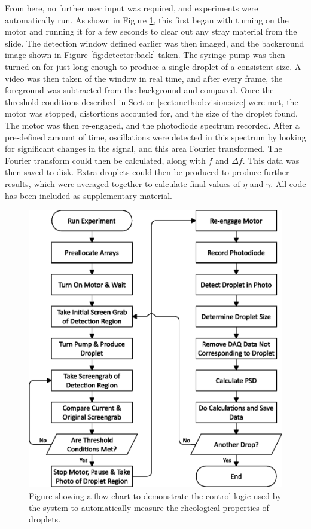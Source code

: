 \documentclass{physics_article_B}
\begin{document}
        \newpage From here, no further user input was required, and experiments were automatically run. As shown in Figure \ref{fig:setup:logic}, this first began with turning on the motor and running it for a few seconds to clear out any stray material from the slide. The detection window defined earlier was then imaged, and the background image shown in Figure \ref{fig:detector:back} taken. The syringe pump was then turned on for just long enough to produce a single droplet of a consistent size. A video was then taken of the window in real time, and after every frame, the foreground was subtracted from the background and compared. Once the threshold conditions described in Section \ref{sect:method:vision:size} were met, the motor was stopped, distortions accounted for, and the size of the droplet found. The motor was then re-engaged, and the photodiode spectrum recorded. After a pre-defined amount of time, oscillations were detected in this spectrum by looking for significant changes in the signal, and this area Fourier transformed. The Fourier transform could then be calculated, along with $f$ and $\Delta f$. This data was then saved to disk. Extra droplets could then be produced to produce further results, which were averaged together to calculate final values of $\eta$ and $\gamma$. All code has been included as supplementary material.
    
            \vspace{0.5cm}\begin{figure}[H]
                \centering
                \hspace*{-1cm}\includegraphics[scale=0.8]{Figures/FlowLogic.eps}
                \caption{Figure showing a flow chart to demonstrate the control logic used by the system to automatically measure the rheological properties of droplets.}
                \label{fig:setup:logic}
            \end{figure}
\end{document}
